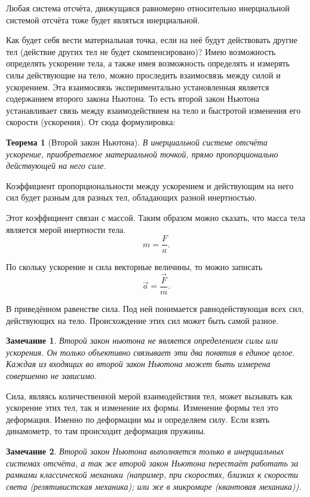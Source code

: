 \documentclass[10pt]{scrbook}
\newtheorem{theorem}{Теорема}[section]
\newtheorem{corollary}{Замечание}[theorem]
\begin{document}
Любая система отсчёта, движущаяся равномерно относительно инерциальной системой
отсчёта тоже будет являться инерциальной.

Как будет себя вести материальная точка, если на неё будут действовать другие
тел (действие других тел не будет скомпенсировано)? Имею возможность определять
ускорение тела, а также имея возможность определять и измерять силы действующие
на тело, можно проследить взаимосвязь между силой и ускорением. Эта взаимосвязь
экспериментально установленная является содержанием второго закона Ньютона. То
есть второй закон Ньютона устанавливает связь между взаимодействием на тело и
быстротой изменения его скорости (ускорения). От сюда формулировка:

\begin{theorem}[Второй закон Ньютона]\label{thrm:second-nuton}
	В инерциальной системе отсчёта ускорение, приобретаемое материальной точкой,
	прямо пропорционально действующей на него силе.
\end{theorem}

Коэффициент пропорциональности между ускорением и действующим на него сил будет
разным для разных тел, обладающих разной инертностью.

Этот коэффициент связан с массой. Таким образом можно сказать, что масса тела
является мерой инертности тела. \[
	m = \frac{F}{a}
	.\]

По скольку ускорение и сила векторные величины, то можно записать \[
	\vec{a} = \frac{\vec{F}}{m}
	.\]

В приведённом равенстве сила. Под ней понимается равнодействующая всех сил,
действующих на тело. Происхождение этих сил может быть самой разное.

\begin{corollary}
	Второй закон ньютона не является определением силы или ускорения. Он только
	объективно связывает эти два понятия в единое целое. Каждая из входящих во
	второй закон Ньютона может быть измерена совершенно не зависимо.
\end{corollary}

Сила, являясь количественной мерой взаимодействия тел, может вызывать как
ускорение этих тел, так и изменение их формы. Изменение формы тел это деформация.
Именно по деформации мы и определяем силу. Если взять динамометр, то там
происходит деформация пружины.

\begin{corollary}
	Второй закон Ньютона выполняется только в инерциальных системах отсчёта, а так
	же второй закон Ньютона перестаёт работать за рамками классической механики
	(например, при скоростях, близких к скорости света (релятивистская механика);
	или же в микромире (квантовая механика)).
\end{corollary}
\end{document}
